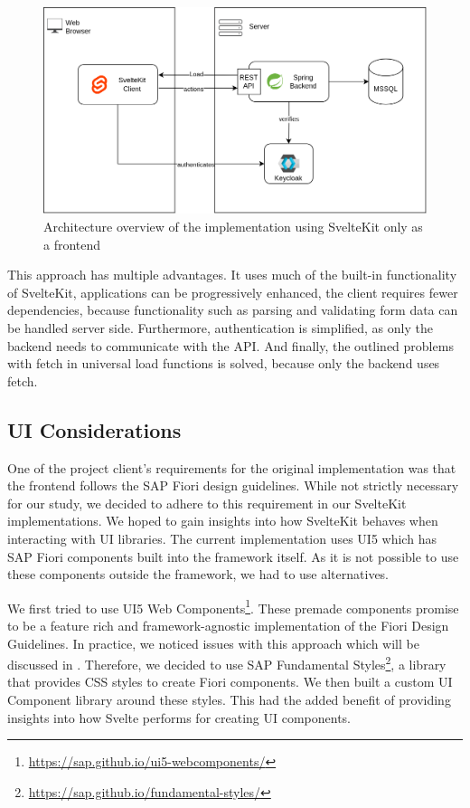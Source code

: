 \begin{figure}[ht]
    \centering
    \includegraphics[width=.8\linewidth]{assets/dswfd-architecture-spa}
    \caption{Architecture overview of the implementation using SvelteKit only as a frontend}
    \label{fig:dswfd-architecture-fe-through-server}
\end{figure}

This approach has multiple advantages. It uses much of the built-in functionality of SvelteKit, applications can be progressively enhanced, the client requires fewer dependencies, because functionality such as parsing and validating form data can be handled server side. Furthermore, authentication is simplified, as only the backend needs to communicate with the API. And finally, the outlined problems with fetch in universal load functions is solved, because only the backend uses fetch.


\subsection{UI Considerations}
\label{sec:implementation-ui}
One of the project client's requirements for the original implementation was that the frontend follows the SAP Fiori design guidelines. While not strictly necessary for our study, we decided to adhere to this requirement in our SvelteKit implementations. We hoped to gain insights into how SvelteKit behaves when interacting with UI libraries. The current implementation uses UI5 which has SAP Fiori components built into the framework itself. As it is not possible to use these components outside the framework, we had to use alternatives.   

We first tried to use UI5 Web Components\footnote{\url{https://sap.github.io/ui5-webcomponents/}}. These premade components promise to be a feature rich and framework-agnostic implementation of the Fiori Design Guidelines. In practice, we noticed issues with this approach which will be discussed in . Therefore, we decided to use SAP Fundamental Styles\footnote{\url{https://sap.github.io/fundamental-styles/}}, a library that provides CSS styles to create Fiori components. We then built a custom UI Component library around these styles. This had the added benefit of providing insights into how Svelte performs for creating UI components.



